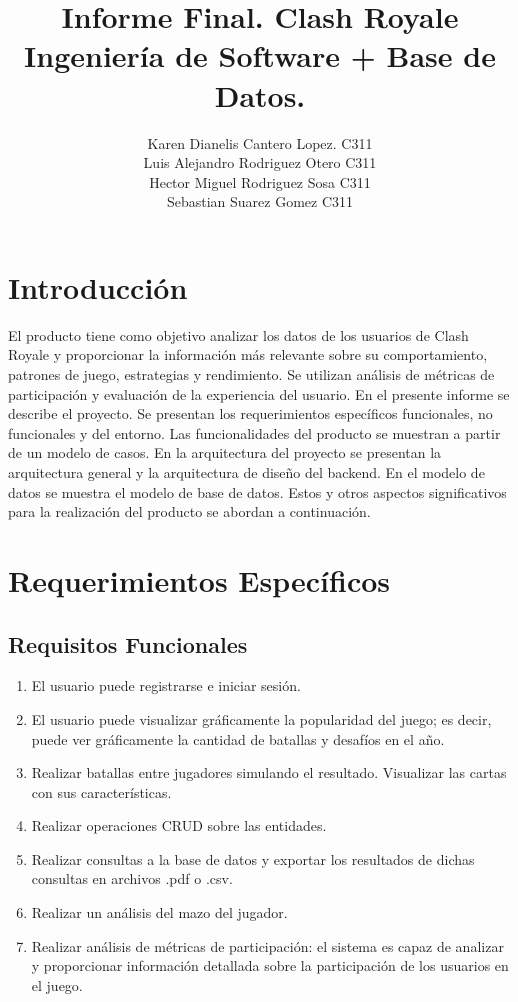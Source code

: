 \documentclass[15pt,a4paper]{article}
\title{Informe Final. Clash Royale\\ Ingeniería de Software + Base de Datos.}
\author{Karen Dianelis Cantero Lopez. C311 \\ Luis Alejandro Rodriguez Otero C311\\  Hector Miguel Rodriguez Sosa C311 \\ Sebastian Suarez Gomez C311 }
\date{}
\begin{document}
\maketitle

\section{Introducción}
El producto tiene como objetivo analizar los datos de los usuarios de Clash Royale y 
proporcionar la información más relevante sobre su comportamiento, patrones de juego, 
estrategias y rendimiento. Se utilizan análisis de métricas de participación y evaluación 
de la experiencia del usuario.
En el presente informe se describe el proyecto. Se presentan los requerimientos 
específicos funcionales, no funcionales y del entorno. Las funcionalidades del producto
se muestran a partir de un modelo de casos. En la arquitectura del proyecto se presentan 
la arquitectura general y la arquitectura de diseño del backend. En el modelo de datos se 
muestra el modelo de base de datos. Estos y otros aspectos significativos para la 
realización del producto se abordan a continuación. 



\section{Requerimientos Específicos}
\subsection*{Requisitos Funcionales}
\begin{enumerate}
\item El usuario puede registrarse e iniciar sesión.
\item El usuario puede visualizar gráficamente la popularidad del juego; es decir, puede 
ver gráficamente la cantidad de batallas y desafíos en el año. 
\item Realizar batallas entre jugadores simulando el resultado.
 Visualizar las cartas con sus características.
\item Realizar operaciones CRUD sobre las entidades.
\item Realizar consultas a la base de datos y exportar los resultados de dichas consultas 
en archivos .pdf o .csv.
\item Realizar un análisis del mazo del jugador.
\item Realizar análisis de métricas de participación: el sistema es capaz de analizar y 
proporcionar información detallada sobre la participación de los usuarios en el 
juego. 
\end{enumerate}
\end{document}
